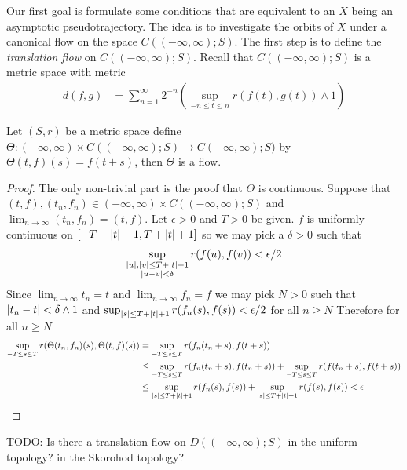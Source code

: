 Our first goal is formulate some conditions that are equivalent to an $X$ being an asymptotic pseudotrajectory.  The idea is to investigate the orbits of $X$ under a canonical flow on the space $C((-\infty, \infty); S)$.  The first step is to define the \emph{translation flow} on $C((-\infty, \infty); S)$.  Recall that $C((-\infty, \infty); S)$ is a metric space with metric
\begin{align*}
d(f,g) &= \sum_{n=1}^\infty 2^{-n} (\sup_{-n \leq t \leq n} r(f(t), g(t)) \wedge 1)
\end{align*}

\begin{prop}Let $(S,r)$ be a metric space define $\Theta : (-\infty, \infty) \times C((-\infty, \infty); S) \to C (-\infty, \infty); S)$ by $\Theta(t,f)(s) =f(t+s)$, then $\Theta$ is a flow.
\end{prop}
\begin{proof}
The only non-trivial part is the proof that $\Theta$ is continuous.  Suppose that $(t, f), (t_n,f_n) \in  (-\infty, \infty) \times C((-\infty, \infty); S)$ and $\lim_{n \to \infty} (t_n, f_n) = (t,f)$.  Let $\epsilon > 0$ and $T > 0$ be given.  $f$ is uniformly continuous on $[-T-\left \vert t \right \vert-1,T+\left \vert t \right \vert+1]$ so we may pick a $\delta > 0$ such that 
\begin{align*}
\sup_{\substack{\left \vert u \right \vert, \left \vert v \right \vert \leq T + \left \vert t \right \vert+1 \\ \left \vert u-v \right \vert < \delta}} r(f(u), f(v)) < \epsilon/2
\end{align*}
Since $\lim_{n \to \infty} t_n = t$ and $\lim_{n \to \infty} f_n = f$ we may pick $N > 0$ such that $\left \vert t_n - t \right \vert < \delta \wedge 1$ and $\sup_{\left \vert s \right \vert \leq T + \left \vert t \right \vert + 1} r(f_n(s), f(s)) < \epsilon/2$ for all $n \geq N$
Therefore for all $n \geq N$
\begin{align*}
\sup_{-T \leq s \leq T} r(\Theta(t_n, f_n)(s), \Theta(t,f)(s)) &= \sup_{-T \leq s \leq T} r(f_n(t_n +s), f(t+s)) \\
&\leq \sup_{-T \leq s \leq T} r(f_n(t_n +s), f(t_n+s)) + \sup_{-T \leq s \leq T} r(f(t_n +s), f(t+s)) \\
&\leq \sup_{\left \vert s \right \vert \leq T+\left \vert t \right \vert+1} r(f_n(s), f(s)) + \sup_{\left \vert s \right \vert \leq T+\left \vert t \right \vert+1} r(f(s), f(s)) < \epsilon \\
\end{align*}
\end{proof}

TODO: Is there a translation flow on $D((-\infty, \infty); S)$ in the uniform topology?  in the Skorohod topology?

